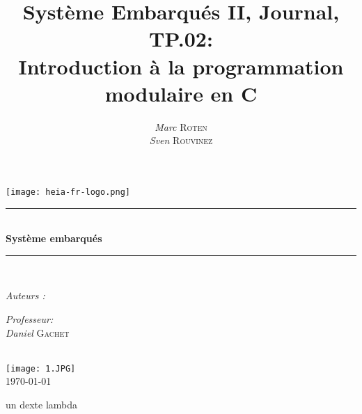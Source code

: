 

\title{Système Embarqués II, Journal, TP.02:\\ Introduction à la programmation modulaire en C} 
\author{\textsl{Marc} \textsc{Roten} \\ \textsl{Sven} \textsc{Rouvinez}}
\date{}


    \begin{titlepage}
        \begin{center}
            \texttt{[image: heia-fr-logo.png]}\\[1.3cm]
            
            \rule{\linewidth}{0.3mm} \\[0.3cm]
            {\huge \bfseries Système embarqués \\[0.5cm]} 
            \rule{\linewidth}{0.3mm} \\[0.8cm]
            \noindent
            \begin{minipage}[t]{0.4\textwidth}
                \begin{flushleft} \large
                    \emph{Auteurs :}\\
                    \theauthor
                \end{flushleft}
            \end{minipage}
            \begin{minipage}[t]{0.4\textwidth} 
                \begin{flushright} \large
                    \emph{Professeur:}\\
                    \textsl{Daniel} \textsc{Gachet}\\ 
                \end{flushright} 
                \vfill
            \end{minipage}\\[1.3cm]
            \texttt{[image: 1.JPG]}\\[1.5cm]
            \vspace*{1\baselineskip}
            \today \\[0.7cm]
        \end{center}
    \end{titlepage}
    \tableofcontents
    \clearpage

\begin{cisco}
   un dexte lambda
\end{cisco}
   

